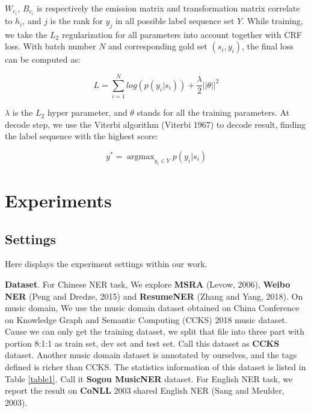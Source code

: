 \documentclass[letterpaper]{article} %
\begin{document}
$W_{c_i}$, $B_{c_i}$ is respectively the emission matrix and transformation matrix correlate to $h_i$, and $j$ is the rank for $y_j$ in all possible label sequence set $Y$.  While training, we take the $L_2$ regularization for all parameters into account together with CRF loss. With batch number $N$ and corresponding gold set $(s_i, y_i)$, the final loss can be computed as:

\begin{equation}
L = \sum_{i=1}^{N}{log(p(y_i | s_i))} + \frac{\lambda}{2}{|| \theta ||}^2
\label{crf_probability}
\end{equation}

$\lambda$ is the $L_2$ hyper parameter, and $\theta$ stands for all the training parameters. At decode step, we use the Viterbi algorithm (Viterbi 1967) to decode result, finding the label sequence with the highest score: 

\begin{equation}
y^* = \mathop{\arg\max}_{y_i \in Y}{p(y_i | s_i)}
\label{crf_decode}
\end{equation}

\section{Experiments}

\subsection{Settings}

Here displays the experiment settings within our work.

\textbf{Dataset}. For Chinese NER task, We explore \textbf{MSRA} (Levow, 2006), \textbf{Weibo NER} (Peng and Dredze, 2015) and \textbf{ResumeNER} (Zhang and Yang, 2018). On music domain, We use the music domain dataset obtained on China Conference on Knowledge Graph and Semantic Computing (CCKS) 2018 music dataset. Cause we can only get the training dataset,  we split that file into three part with portion 8:1:1 as train set, dev set and test set. Call this dataset as \textbf{CCKS} dataset. Another music domain dataset is annotated by ourselves, and the tags defined is richer than CCKS. The statistics information of this dataset is listed in Table \ref{table1}. Call it \textbf{Sogou MusicNER} dataset. For English NER task, we report the result on \textbf{CoNLL} 2003 shared English NER (Sang and Meulder, 2003).

\begin{table}[t]
\caption{Statistics of Sogou MusicNER dataset.}\smallskip
\centering
{}
\label{table1}
\end{table}
\end{document}
